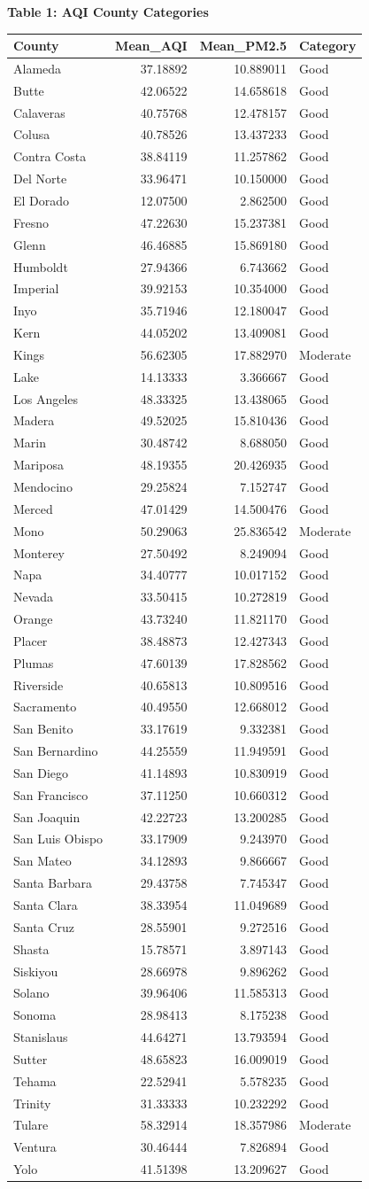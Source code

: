 \documentclass[
]{article}
\begin{document}
\textbf{Table 1: AQI County Categories}

\begin{longtable}[]{@{}lrrl@{}}
\toprule
County & Mean\_AQI & Mean\_PM2.5 & Category\tabularnewline
\midrule
\endhead
Alameda & 37.18892 & 10.889011 & Good\tabularnewline
Butte & 42.06522 & 14.658618 & Good\tabularnewline
Calaveras & 40.75768 & 12.478157 & Good\tabularnewline
Colusa & 40.78526 & 13.437233 & Good\tabularnewline
Contra Costa & 38.84119 & 11.257862 & Good\tabularnewline
Del Norte & 33.96471 & 10.150000 & Good\tabularnewline
El Dorado & 12.07500 & 2.862500 & Good\tabularnewline
Fresno & 47.22630 & 15.237381 & Good\tabularnewline
Glenn & 46.46885 & 15.869180 & Good\tabularnewline
Humboldt & 27.94366 & 6.743662 & Good\tabularnewline
Imperial & 39.92153 & 10.354000 & Good\tabularnewline
Inyo & 35.71946 & 12.180047 & Good\tabularnewline
Kern & 44.05202 & 13.409081 & Good\tabularnewline
Kings & 56.62305 & 17.882970 & Moderate\tabularnewline
Lake & 14.13333 & 3.366667 & Good\tabularnewline
Los Angeles & 48.33325 & 13.438065 & Good\tabularnewline
Madera & 49.52025 & 15.810436 & Good\tabularnewline
Marin & 30.48742 & 8.688050 & Good\tabularnewline
Mariposa & 48.19355 & 20.426935 & Good\tabularnewline
Mendocino & 29.25824 & 7.152747 & Good\tabularnewline
Merced & 47.01429 & 14.500476 & Good\tabularnewline
Mono & 50.29063 & 25.836542 & Moderate\tabularnewline
Monterey & 27.50492 & 8.249094 & Good\tabularnewline
Napa & 34.40777 & 10.017152 & Good\tabularnewline
Nevada & 33.50415 & 10.272819 & Good\tabularnewline
Orange & 43.73240 & 11.821170 & Good\tabularnewline
Placer & 38.48873 & 12.427343 & Good\tabularnewline
Plumas & 47.60139 & 17.828562 & Good\tabularnewline
Riverside & 40.65813 & 10.809516 & Good\tabularnewline
Sacramento & 40.49550 & 12.668012 & Good\tabularnewline
San Benito & 33.17619 & 9.332381 & Good\tabularnewline
San Bernardino & 44.25559 & 11.949591 & Good\tabularnewline
San Diego & 41.14893 & 10.830919 & Good\tabularnewline
San Francisco & 37.11250 & 10.660312 & Good\tabularnewline
San Joaquin & 42.22723 & 13.200285 & Good\tabularnewline
San Luis Obispo & 33.17909 & 9.243970 & Good\tabularnewline
San Mateo & 34.12893 & 9.866667 & Good\tabularnewline
Santa Barbara & 29.43758 & 7.745347 & Good\tabularnewline
Santa Clara & 38.33954 & 11.049689 & Good\tabularnewline
Santa Cruz & 28.55901 & 9.272516 & Good\tabularnewline
Shasta & 15.78571 & 3.897143 & Good\tabularnewline
Siskiyou & 28.66978 & 9.896262 & Good\tabularnewline
Solano & 39.96406 & 11.585313 & Good\tabularnewline
Sonoma & 28.98413 & 8.175238 & Good\tabularnewline
Stanislaus & 44.64271 & 13.793594 & Good\tabularnewline
Sutter & 48.65823 & 16.009019 & Good\tabularnewline
Tehama & 22.52941 & 5.578235 & Good\tabularnewline
Trinity & 31.33333 & 10.232292 & Good\tabularnewline
Tulare & 58.32914 & 18.357986 & Moderate\tabularnewline
Ventura & 30.46444 & 7.826894 & Good\tabularnewline
Yolo & 41.51398 & 13.209627 & Good\tabularnewline
\bottomrule
\end{longtable}
\end{document}
